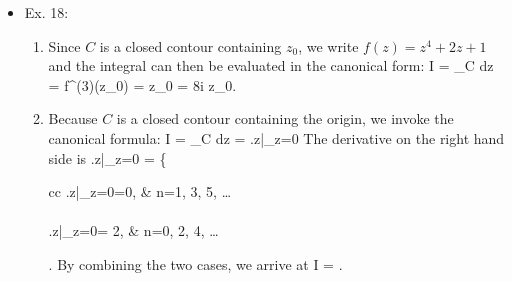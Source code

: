 \documentclass[10pt, letterpaper]{article}
\begin{document}
\begin{itemize}
	Instead of taking the path from the origin to $(x,y)=(0,1)$ along the imaginary axis, we could compute the integral
	from the origin to $(x,y)=(1,0)$ along the real axis ($OA$), then from $(1,0)$ to $(1,0)$ along the line $y=1-x$ ($AB$).
	Let's do this.

	On the first path $y=0$ and $dy=0$. So the integrand Eq.~(\ref{eq:ex16integrand}) becomes $\sin 2x$, thus
	\be
		\int_{OA} \sin 2z\,dz = \int_0^1\sin 2x\,dx  = (1-). \nonumber
	\ee

	Going from $(1,0)$ to $(0,1)$, we have $y=1-x$. This leads to
	\begin{align}
		\int_{AB} \sin 2z\,dz
			=& \int_{AB} (\cosh 2y\sin 2x\,dx - \sinh 2y\cos 2x\,dy) + 
			   i\int_{AB} (\cosh 2y\sin 2x\,dy + \sinh 2y\cos 2x\,dx) \nonumber\\
			=& -\int_0^1 (\cosh 2y\sin 2(1-y)\,dy + \sinh 2y\cos 2(1-y)\,dy) \nonumber \\
			 & + i\int_0^1 (\cosh 2y\sin 2(1-y)\,dy - \sinh 2y\cos 2(1-y)\,dy) \nonumber\\
			=& -\frac{1}{2}\left[\vphantom{\int} \cosh 2y \cos 2(1-y)\right]_0^1 
			   + \frac{i}{2}\left[\vphantom{\int} \sinh2y \sin 2(1-y)\right]_0^1 \nonumber\\
			=& \frac{1}{2}(\cos 2 - \cosh 2). \nonumber
	\end{align}

	Finally,
	\be
		\int_0^i\sin 2z\,dz = \int_{OA}\sin 2z\,dz + \int_{AB}\sin 2z\,dz = (1-),
	\ee
	in agreement with Eq.~(\ref{ex16:direct_integral}) as expected.

	\item Ex. 18:
	\begin{enumerate}
		\item Since $C$ is a closed contour containing $z_0$, we write $f(z) = z^4 + 2z + 1$ and the integral can then
		be evaluated in the canonical form:
		\be
			I = \oint_C dz =  f^{(3)}(z_0) =  z_0 = 8\pi i z_0.
			\nonumber
		\ee

		\item Because $C$ is a closed contour containing the origin, we invoke the canonical formula:
		\be
			I = \oint_C dz = \left.\cosh z\right|_{z=0}
			\nonumber
		\ee
		The derivative on the right hand side is
		\be
			\left.\cosh z\right|_{z=0} = 
			\left\{
				\begin{array}{cc}
				\left.\sinh z\right|_{z=0}=0,         & n=1, 3, 5, \ldots\\ \\
				\left.\cosh z\right|_{z=0}= 2, & n=0, 2, 4, \ldots
				\end{array}
			\right.
			\nonumber
		\ee
		By combining the two cases, we arrive at
		\be
			I = . \nonumber
		\ee


\end{enumerate}
\end{itemize}
\end{document}
